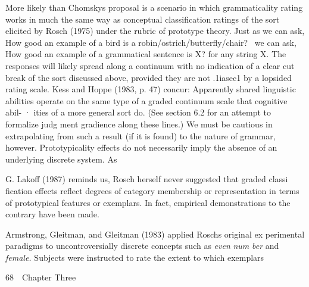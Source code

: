 \begin{styleTextbody}
More likely than Chomsky{\textquotesingle}s proposal is a scenario in which grammaticality rating works in much the same way as conceptual classification ratings of the sort elicited by Rosch (1975) under the rubric of prototype theory. Just as we can ask, {\textquotedbl}How good an example of a bird is a robin/ostrich/butterfly/chair?{\textquotedbl} \ we can ask, {\textquotedbl}How good an example of a grammatical sentence is X?{\textquotedbl} for any string X. The responses will likely spread along a continuum with no indication of a clear\- cut break of the sort discussed above, provided they are not .1{\textquotesingle}iasec1 by a lopsided rating scale. Kess and Hoppe (1983, p. 47) concur: {\textquotedbl}Apparently shared linguistic abilities operate on the same type of a graded continuum scale that cognitive abil- · ities of a more general sort do.{\textquotedbl} (See section 6.2 for an attempt to formalize judg\- ment gradience along these lines.) We must be cautious in extrapolating from such a result (if it is found) to the nature of grammar, however. Prototypicality effects do not necessarily imply the absence of an underlying discrete system. As
\end{styleTextbody}


\begin{styleTextbody}
G. Lakoff (1987) reminds us, Rosch herself never suggested that graded classi\- fication effects reflect degrees of category membership or representation in terms of prototypical features or exemplars. In fact, empirical demonstrations to the contrary have been made.
\end{styleTextbody}


\begin{styleTextbody}
Armstrong, Gleitman, and Gleitman (1983) applied Rosch{\textquotesingle}s original ex\- perimental paradigms to uncontroversially discrete concepts such as \textit{even}\textit{ }\textit{num\-}\textit{ }\textit{ber}\textit{ }and \textit{female.}\textit{ }Subjects were instructed to rate the extent to which exemplars
\end{styleTextbody}


\clearpage\setcounter{page}{1}\begin{styleStandard}
68\ \ Chapter Three
\end{styleStandard}


